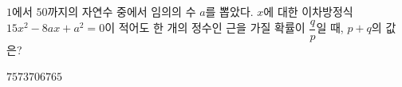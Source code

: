 $1$에서 $50$까지의 자연수 중에서 임의의 수 $a$를 뽑았다. $x$에 대한 이차방정식 $15x^2-8ax+a^2=0$이 적어도 한 개의 정수인 근을 가질 확률이 $\dfrac{q}{p}$일 때, $p+q$의 값은? 
\begin{choices32}{$75$}{$73$}{$70$}{$67$}{$65$}\end{choices32}
